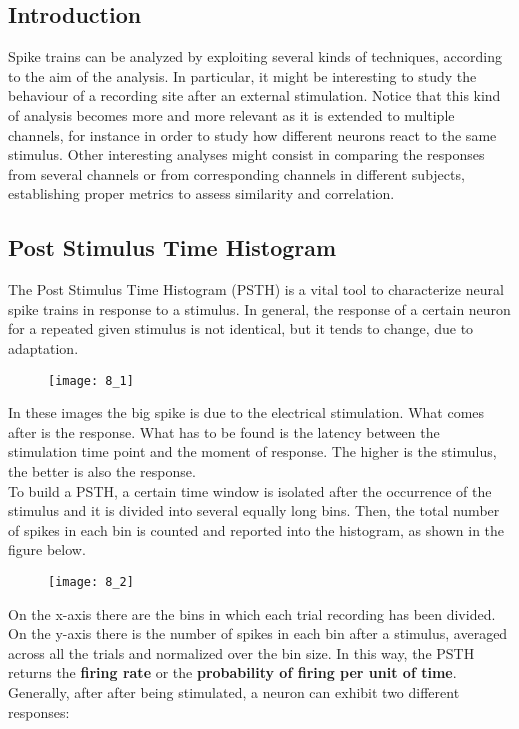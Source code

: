 \subsection{Introduction}
Spike trains can be analyzed by exploiting several kinds of techniques, according
to the aim of the analysis. In particular, it might be interesting to study the
behaviour of a recording site after an external stimulation. Notice that this kind
of analysis becomes more and more relevant as it is extended to multiple channels, for
instance in order to study how different neurons react to the same stimulus. Other
interesting analyses might consist in comparing the responses from several channels or
from corresponding channels in different subjects, establishing proper metrics to assess
similarity and correlation.

\subsection{Post Stimulus Time Histogram}
The Post Stimulus Time Histogram (PSTH) is a vital tool to characterize neural spike trains
in response to a stimulus. In general, the response of a certain neuron
for a repeated given stimulus is not identical, but it tends to change, due to adaptation.
\begin{figure}[H]
    \texttt{[image: 8\_1]}
    \centering
\end{figure}
In these images the big spike is due to the electrical stimulation. What comes after is
the response. What has to be found is the latency between the stimulation time point and the
moment of response. The higher is the stimulus, the better is also the response.\\
To build a PSTH, a certain time window is isolated after the occurrence of the stimulus and
it is divided into several equally long bins. Then, the total number of spikes in each bin
is counted and reported into the histogram, as shown in the figure below.
\begin{figure}[H]
    \texttt{[image: 8\_2]}
    \centering
\end{figure}
On the x-axis there are the bins in which each trial recording has been divided.
On the y-axis there is the number of spikes in each bin after a stimulus, averaged
across all the trials and normalized over the bin size. In this way, the PSTH returns the
\textbf{firing rate} or the \textbf{probability of firing per unit of time}.\\
Generally, after after being stimulated, a neuron can exhibit two different responses:
